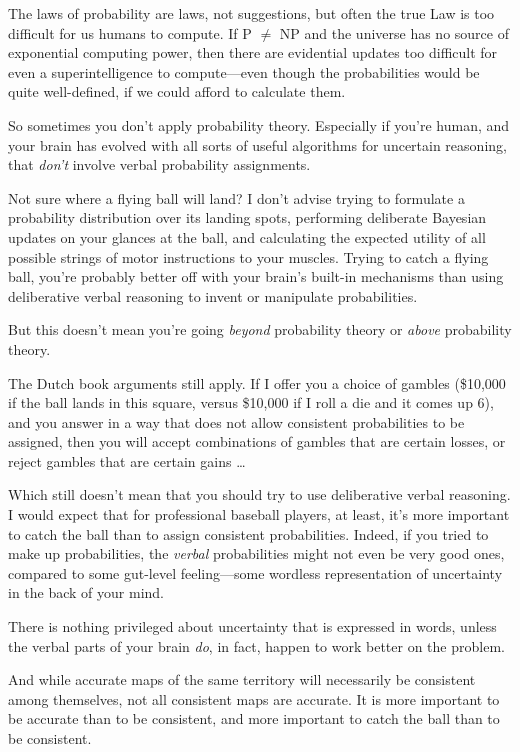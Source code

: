 {
 The laws of probability are laws, not suggestions, but often the
true Law is too difficult for us humans to compute. If P ${\neq}$ NP
and the universe has no source of exponential computing power, then
there are evidential updates too difficult for even a superintelligence
to compute---even though the probabilities would be quite well-defined,
if we could afford to calculate them.}

{
 So sometimes you don't apply probability theory.
Especially if you're human, and your brain has evolved
with all sorts of useful algorithms for uncertain reasoning, that
\textit{don't} involve verbal probability assignments.}

{
 Not sure where a flying ball will land? I don't
advise trying to formulate a probability distribution over its landing
spots, performing deliberate Bayesian updates on your glances at the
ball, and calculating the expected utility of all possible strings of
motor instructions to your muscles. Trying to catch a flying ball,
you're probably better off with your
brain's built-in mechanisms than using deliberative
verbal reasoning to invent or manipulate probabilities.}

{
 But this doesn't mean you're going
\textit{beyond} probability theory or \textit{above} probability
theory.}

{
 The Dutch book arguments still apply. If I offer you a choice of
gambles (\$10,000 if the ball lands in this square, versus \$10,000 if
I roll a die and it comes up 6), and you answer in a way that does not
allow consistent probabilities to be assigned, then you will accept
combinations of gambles that are certain losses, or reject gambles that
are certain gains \ldots}

{
 Which still doesn't mean that you should try to
use deliberative verbal reasoning. I would expect that for professional
baseball players, at least, it's more important to
catch the ball than to assign consistent probabilities. Indeed, if you
tried to make up probabilities, the \textit{verbal} probabilities might
not even be very good ones, compared to some gut-level feeling---some
wordless representation of uncertainty in the back of your mind.}

{
 There is nothing privileged about uncertainty that is expressed in
words, unless the verbal parts of your brain \textit{do}, in fact,
happen to work better on the problem.}

{
 And while accurate maps of the same territory will necessarily be
consistent among themselves, not all consistent maps are accurate. It
is more important to be accurate than to be consistent, and more
important to catch the ball than to be consistent.}

